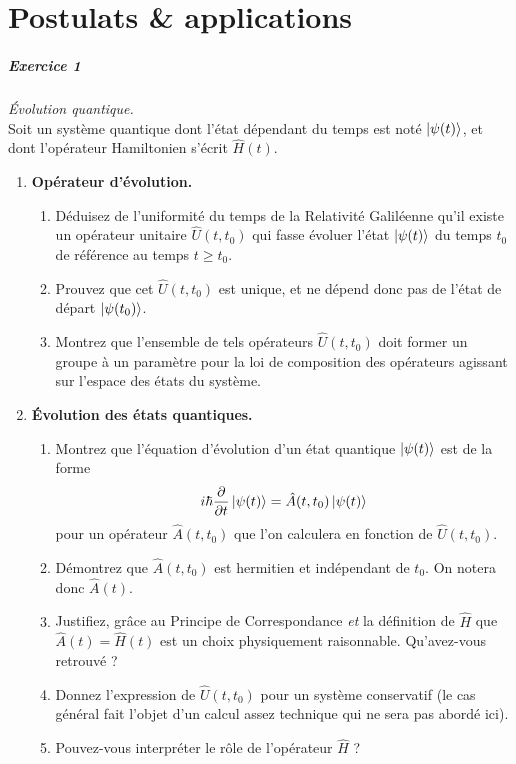 \chapter{Postulats \& applications}

\paragraph{Exercice 1} \textit{Évolution quantique.}\\
Soit un système quantique dont l'état dépendant du temps est noté $\ket{\psi(t)}$, et dont l'opérateur Hamiltonien s'écrit $\hat H(t)$. 
\begin{enumerate}
\item \textbf{Opérateur d'évolution.}
\begin{enumerate}
\item Déduisez de l'uniformité du temps de la Relativité Galiléenne qu'il existe un opérateur unitaire $\hat U(t,t_0)$ qui fasse évoluer l'état $\ket{\psi(t)}$ du temps $t_0$ de référence au temps $t\geq t_0$. 
\item Prouvez que cet $\hat U(t,t_0)$ est unique, et ne dépend donc pas de l'état de départ $\ket{\psi(t_0)}$.
\item Montrez que l'ensemble de tels opérateurs $\hat U(t,t_0)$ doit former un groupe à un paramètre pour la loi de composition des opérateurs agissant sur l'espace des états du système.
\end{enumerate} 
\item \textbf{Évolution des états quantiques.}
\begin{enumerate}
\item Montrez que l'équation d'évolution d'un état quantique $\ket{\psi(t)}$ est de la forme 
\begin{equation}
i\hbar \frac{\partial}{\partial t}\ket{\psi(t)} = \hat A(t,t_0)\ket{\psi(t)}
\end{equation}
pour un opérateur $\hat A(t,t_0)$ que l'on calculera en fonction de $\hat U(t,t_0)$.
\item Démontrez que $\hat A(t,t_0)$ est hermitien et indépendant de $t_0$. On notera donc $\hat A(t)$.
\item Justifiez, grâce au Principe de Correspondance \textit{et} la définition de $\hat H$ que $\hat A(t) = \hat H(t)$ est un choix physiquement raisonnable. Qu'avez-vous retrouvé ?
\item Donnez l'expression de $\hat U(t,t_0)$ pour un système conservatif (le cas général fait l'objet d'un calcul assez technique qui ne sera pas abordé ici). 
\item Pouvez-vous interpréter le rôle de l'opérateur $\hat H$ ?
\end{enumerate}
\end{enumerate}


